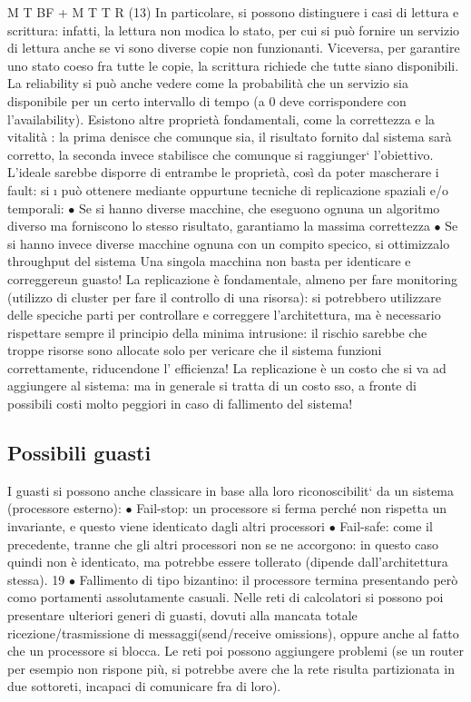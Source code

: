 M T BF + M T T R
(13)
In particolare, si possono distinguere i casi di lettura e scrittura: infatti, la lettura
non modica lo stato, per cui si può fornire un servizio di lettura anche se vi
sono diverse copie non funzionanti. Viceversa, per garantire uno stato coeso fra
tutte le copie, la scrittura richiede che tutte siano disponibili.
La reliability si può anche vedere come la probabilità che un servizio sia
disponibile per un certo intervallo di tempo (a 0 deve corrispondere con l'availability).
Esistono altre proprietà fondamentali, come la correttezza e la vitalità : la
prima denisce che comunque sia, il risultato fornito dal sistema sarà corretto,
la seconda invece stabilisce che comunque si raggiunger` l'obiettivo. L'ideale
sarebbe disporre di entrambe le proprietà, così da poter mascherare i fault: si
\i{}
può ottenere mediante oppurtune tecniche di replicazione spaziali e/o temporali:
$\bullet$ Se si hanno diverse macchine, che eseguono ognuna un algoritmo diverso
ma forniscono lo stesso risultato, garantiamo la massima correttezza
$\bullet$ Se si hanno invece diverse macchine ognuna con un compito specico, si
ottimizzalo throughput del sistema
Una singola macchina non basta per identicare e correggereun guasto! La
replicazione è fondamentale, almeno per fare monitoring (utilizzo di cluster per
fare il controllo di una risorsa): si potrebbero utilizzare delle speciche parti
per controllare e correggere l'architettura, ma è necessario rispettare sempre il
principio della minima intrusione: il rischio sarebbe che troppe risorse sono
allocate solo per vericare che il sistema funzioni correttamente, riducendone l'
efficienza! La replicazione è un costo che si va ad aggiungere al sistema: ma in
generale si tratta di un costo sso, a fronte di possibili costi molto peggiori in
caso di fallimento del sistema!
\subsection{Possibili guasti}
I guasti si possono anche classicare in base alla loro riconoscibilit` da un sistema
(processore esterno):
$\bullet$ Fail-stop: un processore si ferma perché non rispetta un invariante, e
questo viene identicato dagli altri processori
$\bullet$ Fail-safe: come il precedente, tranne che gli altri processori non se ne
accorgono: in questo caso quindi non è identicato, ma potrebbe essere
tollerato (dipende dall'architettura stessa).
19
$\bullet$ Fallimento di tipo bizantino: il processore termina presentando però como
portamenti assolutamente casuali.
Nelle reti di calcolatori si possono poi presentare ulteriori generi di guasti, dovuti
alla mancata totale ricezione/trasmissione di messaggi(send/receive omissions),
oppure anche al fatto che un processore si blocca. Le reti poi possono aggiungere
problemi (se un router per esempio non rispone più, si potrebbe avere che la
rete risulta partizionata in due sottoreti, incapaci di comunicare fra di loro).
